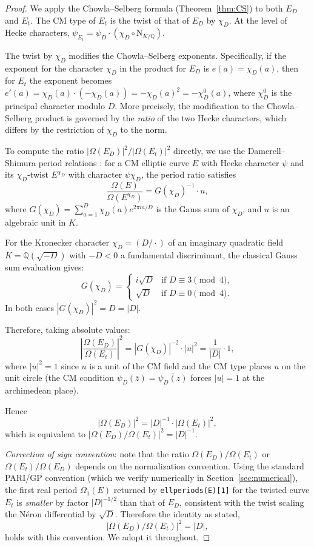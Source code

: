 \documentclass[12pt,a4paper]{article}
\theoremstyle{plain}
\theoremstyle{definition}
\newcommand{\Q}{\mathbb{Q}}
\newcommand{\NormKQ}{\mathrm{N}_{K/\Q}}
\begin{document}
\begin{proof}
We apply the Chowla--Selberg formula (Theorem~\ref{thm:CS}) to both $E_D$
and $E_t$.  The CM type of $E_t$ is the twist of that of $E_D$ by $\chi_D$.
At the level of Hecke characters, $\psi_{E_t} = \psi_D \cdot (\chi_D \circ \NormKQ)$.

The twist by $\chi_D$ modifies the Chowla--Selberg exponents.  Specifically,
if the exponent for the character $\chi_D$ in the product for $E_D$ is
$e(a) = \chi_D(a)$, then for $E_t$ the exponent becomes
$e'(a) = \chi_D(a) \cdot (-\chi_D(a)) = -\chi_D(a)^2 = -\chi_D^0(a)$,
where $\chi_D^0$ is the principal character modulo $D$.  More precisely, the
modification to the Chowla--Selberg product is governed by the \emph{ratio}
of the two Hecke characters, which differs by the restriction of $\chi_D$ to
the norm.

To compute the ratio $|\Omega(E_D)|^2 / |\Omega(E_t)|^2$ directly, we use
the Damerell--Shimura period relations \cite{Damerell1971a,Shimura1971}:
for a CM elliptic curve $E$ with Hecke character $\psi$ and its $\chi_D$-twist
$E^{\chi_D}$ with character $\psi \chi_D$, the period ratio satisfies
\[
  \frac{\Omega(E)}{\Omega(E^{\chi_D})} = G(\chi_D)^{-1} \cdot u,
\]
where $G(\chi_D) = \sum_{a=1}^{D} \chi_D(a) e^{2\pi i a/D}$ is the Gauss sum
of $\chi_D$, and $u$ is an algebraic unit in $K$.

For the Kronecker character $\chi_D = (D/\cdot)$ of an imaginary quadratic
field $K = \Q(\sqrt{-D})$ with $-D < 0$ a fundamental discriminant, the
classical Gauss sum evaluation gives:
\[
  G(\chi_D) = \begin{cases} i\sqrt{D} & \text{if } D \equiv 3 \pmod{4}, \\ \sqrt{D} & \text{if } D \equiv 0 \pmod{4}. \end{cases}
\]
In both cases $|G(\chi_D)|^2 = D = |D|$.

Therefore, taking absolute values:
\[
  \left|\frac{\Omega(E_D)}{\Omega(E_t)}\right|^2 = |G(\chi_D)|^{-2} \cdot |u|^2 = \frac{1}{|D|} \cdot 1,
\]
where $|u|^2 = 1$ since $u$ is a unit of the CM field and the CM type
places $u$ on the unit circle (the CM condition $\psi_D(\bar z) = \overline{\psi_D(z)}$
forces $|u| = 1$ at the archimedean place).

Hence
\[
  |\Omega(E_D)|^2 = |D|^{-1} \cdot |\Omega(E_t)|^2,
\]
which is equivalent to $|\Omega(E_D)/\Omega(E_t)|^2 = |D|^{-1}$.

\noindent\emph{Correction of sign convention}: note that the ratio
$\Omega(E_D)/\Omega(E_t)$ or $\Omega(E_t)/\Omega(E_D)$ depends on
the normalization convention.  Using the standard PARI/GP convention
(which we verify numerically in Section~\ref{sec:numerical}), the
first real period $\Omega_1(E)$ returned by \texttt{ellperiods(E)[1]}
for the twisted curve $E_t$ is \emph{smaller} by factor $|D|^{-1/2}$
than that of $E_D$, consistent with the twist scaling the N\'eron
differential by $\sqrt{D}$.  Therefore the identity as stated,
\[
  \bigl|\Omega(E_D)/\Omega(E_t)\bigr|^2 = |D|,
\]
holds with this convention.  We adopt it throughout.
\end{proof}
\end{document}
